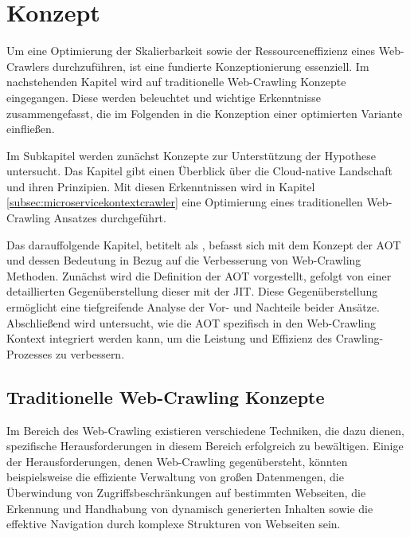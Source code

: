 \chapter{Konzept}
\label{chap:concept}
\chapterstart

Um eine Optimierung der Skalierbarkeit sowie der Ressourceneffizienz eines Web-Crawlers durchzuführen, ist eine fundierte Konzeptionierung essenziell. Im nachstehenden Kapitel wird auf traditionelle Web-Crawling Konzepte eingegangen. Diese werden beleuchtet und wichtige Erkenntnisse zusammengefasst, die im Folgenden in die Konzeption einer optimierten Variante einfließen. 

Im Subkapitel \textit{} werden zunächst Konzepte zur Unterstützung der Hypothese \textit{} untersucht. Das Kapitel gibt einen Überblick über die Cloud-native Landschaft und ihren Prinzipien. Mit diesen Erkenntnissen wird in Kapitel \ref{subsec:microservicekontextcrawler} eine Optimierung eines traditionellen Web-Crawling Ansatzes durchgeführt.

Das darauffolgende Kapitel, betitelt als \textit{}, befasst sich mit dem Konzept der \ac{AOT} und dessen Bedeutung in Bezug auf die Verbesserung von Web-Crawling Methoden. Zunächst wird die Definition der \acl{AOT} vorgestellt, gefolgt von einer detaillierten Gegenüberstellung dieser mit der \acl{JIT}. Diese Gegenüberstellung ermöglicht eine tiefgreifende Analyse der Vor- und Nachteile beider Ansätze. Abschließend wird untersucht, wie die \acl{AOT} spezifisch in den Web-Crawling Kontext integriert werden kann, um die Leistung und Effizienz des Crawling-Prozesses zu verbessern.
\section{Traditionelle Web-Crawling Konzepte}\label{sec:traditionalconcepts}
Im Bereich des Web-Crawling existieren verschiedene Techniken, die dazu dienen, spezifische Herausforderungen in diesem Bereich erfolgreich zu bewältigen. Einige der Herausforderungen, denen Web-Crawling gegenübersteht, könnten beispielsweise die effiziente Verwaltung von großen Datenmengen, die Überwindung von Zugriffsbeschränkungen auf bestimmten Webseiten, die Erkennung und Handhabung von dynamisch generierten Inhalten sowie die effektive Navigation durch komplexe Strukturen von Webseiten sein. 

